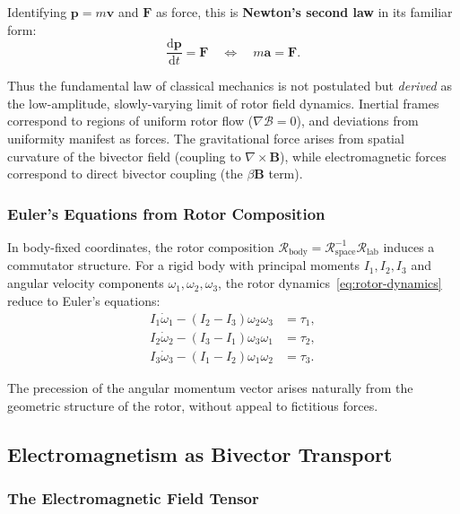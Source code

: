 \documentclass[11pt,a4paper]{article}
\newcommand{\Rotor}{\mathcal{R}}
\newcommand{\Biv}{\mathcal{B}}
\newcommand{\D}{\nabla}                        %
\theoremstyle{definition}
\theoremstyle{plain}
\theoremstyle{remark}
\begin{document}
Identifying $\mathbf{p} = m\mathbf{v}$ and $\mathbf{F}$ as force, this is \textbf{Newton's second law} in its familiar form:
\begin{equation}
\boxed{\frac{\mathrm{d}\mathbf{p}}{\mathrm{d}t} = \mathbf{F} \quad \Longleftrightarrow \quad m\mathbf{a} = \mathbf{F}.}
\label{eq:newton-final}
\end{equation}

Thus the fundamental law of classical mechanics is not postulated but \emph{derived} as the low-amplitude, slowly-varying limit of rotor field dynamics. Inertial frames correspond to regions of uniform rotor flow ($\D\Biv = 0$), and deviations from uniformity manifest as forces. The gravitational force arises from spatial curvature of the bivector field (coupling to $\nabla \times \mathbf{B}$), while electromagnetic forces correspond to direct bivector coupling (the $\beta\mathbf{B}$ term).

\subsubsection{Euler's Equations from Rotor Composition}

In body-fixed coordinates, the rotor composition $\Rotor_{\text{body}} = \Rotor_{\text{space}}^{-1} \Rotor_{\text{lab}}$ induces a commutator structure. For a rigid body with principal moments $I_1, I_2, I_3$ and angular velocity components $\omega_1, \omega_2, \omega_3$, the rotor dynamics~\eqref{eq:rotor-dynamics} reduce to Euler's equations:
\begin{align}
I_1 \dot{\omega}_1 - (I_2 - I_3)\omega_2\omega_3 &= \tau_1, \\
I_2 \dot{\omega}_2 - (I_3 - I_1)\omega_3\omega_1 &= \tau_2, \\
I_3 \dot{\omega}_3 - (I_1 - I_2)\omega_1\omega_2 &= \tau_3.
\end{align}

The precession of the angular momentum vector arises naturally from the geometric structure of the rotor, without appeal to fictitious forces.

\subsection{Electromagnetism as Bivector Transport}

\subsubsection{The Electromagnetic Field Tensor}
\end{document}
